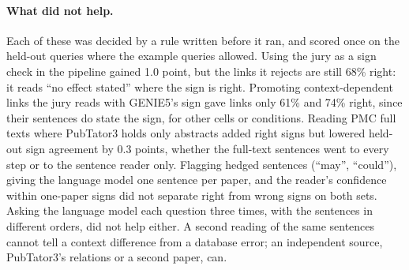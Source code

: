 \documentclass[11pt,a4paper]{article}
\newcommand{\gen}{GENIE5}
\begin{document}
\paragraph{What did not help.} Each of these was decided by a rule written before it ran, and
scored once on the held-out queries where the example queries allowed. Using the jury as a sign
check in the pipeline gained 1.0 point, but the links it rejects are still 68\% right: it reads
``no effect stated'' where the sign is right. Promoting context-dependent links the jury reads with
\gen{}'s sign gave links only 61\% and 74\% right, since their sentences do state the sign, for
other cells or conditions. Reading PMC full texts where PubTator3 holds only abstracts added
right signs but lowered held-out sign agreement by 0.3 points, whether the full-text sentences went to
every step or to the sentence reader only. Flagging hedged sentences (``may'', ``could''), giving
the language model one sentence per paper, and the reader's confidence within one-paper signs did
not separate right from wrong signs on both sets. Asking the language model each question three
times, with the sentences in different orders, did not help either. A second reading of the same sentences cannot
tell a context difference from a database error; an independent source, PubTator3's relations or
a second paper, can.
\end{document}

